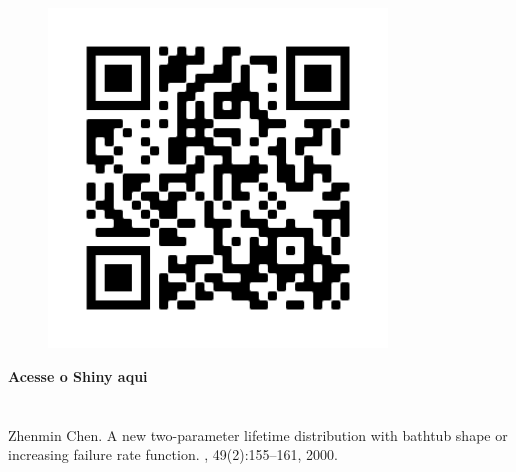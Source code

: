\documentclass{sciposter}
\begin{document}
\begin{multicols*}{2}
{\begin{multicols}{2}
{\begin{figure}[h]
\centering
\includegraphics[width=9cm]{imgs/frame.png}
\end{figure}
\centerline{\textbf{Acesse o Shiny aqui}}
}
\end{multicols}







\section*{}
\begingroup
\renewcommand{\section}[2]{}
\begin{thebibliography}{99}
\small




Zhenmin Chen.
\newblock A new two-parameter lifetime distribution with bathtub shape or
  increasing failure rate function.
, 49(2):155--161, 2000.




\end{thebibliography}}
\end{multicols*}
\end{document}
